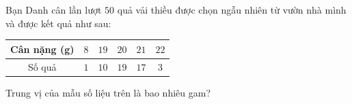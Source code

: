 \begin{ex}
Bạn Danh cân lần lượt $50$ quả vải thiều được chọn ngẫu nhiên từ vườn nhà mình và được kết quả như sau:
\begin{center}
\begin{tabular}{|c|c|c|c|c|c|}\hline
Cân nặng (g) & $8$ & $19$ & $20$ & $21$ & $22$\\\hline
Số quả & $1$ & $10$ & $19$ & $17$ & $3$\\\hline
\end{tabular}
\end{center}
Trung vị của mẫu số liệu trên là bao nhiêu gam?
\end{ex}
